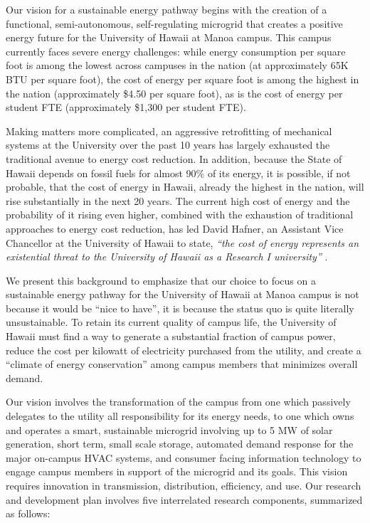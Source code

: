 Our vision for a sustainable energy pathway begins with the creation of a
functional, semi-autonomous, self-regulating microgrid that creates a
positive energy future for the University of Hawaii at Manoa campus. This
campus currently faces severe energy challenges: while energy
consumption per square foot is among the lowest across campuses in the
nation (at approximately 65K BTU per square foot), the cost of energy per
square foot is among the highest in the nation (approximately \$4.50 per
square foot), as is the cost of energy per student FTE (approximately
\$1,300 per student FTE).  

Making matters more complicated, an aggressive retrofitting of mechanical
systems at the University over the past 10 years has largely exhausted the
traditional avenue to energy cost reduction.  In addition, because the
State of Hawaii depends on fossil fuels for almost 90\% of its energy, it
is possible, if not probable, that the cost of energy in Hawaii, already
the highest in the nation, will rise substantially in the next 20
years. The current high cost of energy and the probability of it rising
even higher, combined with the exhaustion of traditional approaches to
energy cost reduction, has led David Hafner, an Assistant Vice Chancellor
at the University of Hawaii to state, {\em ``the cost of energy represents
  an {\em existential} threat to the University of Hawaii as a Research I
  university''} \cite{Hafner2011}.

We present this background to emphasize that our choice to focus on a
sustainable energy pathway for the University of Hawaii at Manoa campus is
not because it would be ``nice to have'', it is because the status quo is
quite literally unsustainable.  To retain its current quality of campus
life, the University of Hawaii must find a way to generate a substantial
fraction of campus power, reduce the cost per kilowatt of electricity
purchased from the utility, and create a ``climate of energy conservation''
among campus members that minimizes overall demand.

Our vision involves the transformation of the campus from one which
passively delegates to the utility all responsibility for its energy needs,
to one which owns and operates a smart, sustainable microgrid involving up
to 5 MW of solar generation, short term, small scale storage, automated
demand response for the major on-campus HVAC systems, and consumer facing
information technology to engage campus members in support of the
microgrid and its goals.  This vision requires innovation in transmission,
distribution, efficiency, and use.  Our research and development plan
involves five interrelated research components, summarized as follows:


